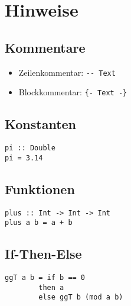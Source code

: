 \documentclass[
  10pt,                   %
  DIV12,
  german,                 %
  oneside,                %
  parskip=half,           %
  headings=normal,        %
  captions=tableheading,  %
]{scrartcl}
\begin{document}
\renewcommand*\thesubsection{\roman{subsection})}

\section*{Hinweise}
\subsection{Kommentare}
\begin{itemize}
\item Zeilenkommentar: \lstinline|-- Text| 
\item Blockkommentar: \lstinline|{- Text -}|
\end{itemize}

\subsection{Konstanten}
\begin{minipage}[hbt]{6cm}
\centering
\begin{lstlisting}
pi :: Double
pi = 3.14
\end{lstlisting}
\end{minipage}
\hfill
\begin{minipage}[hbt]{8cm}
\centering
\scalebox{0.7}{}
\end{minipage}

\subsection{Funktionen}
\begin{minipage}[hbt]{6cm}
\centering
\begin{lstlisting}
plus :: Int -> Int -> Int
plus a b = a + b
\end{lstlisting}
\end{minipage}
\hfill
\begin{minipage}[hbt]{8cm}
\centering
\scalebox{0.6}{}
\end{minipage}

\subsection{If-Then-Else}
\begin{minipage}[hbt]{6cm}
\centering
\begin{lstlisting}
ggT a b = if b == 0 
        then a 
        else ggT b (mod a b)
\end{lstlisting}
\end{minipage}
\hfill
\begin{minipage}[hbt]{8cm}
\centering
\scalebox{0.7}{}
\end{minipage}
\end{document}
